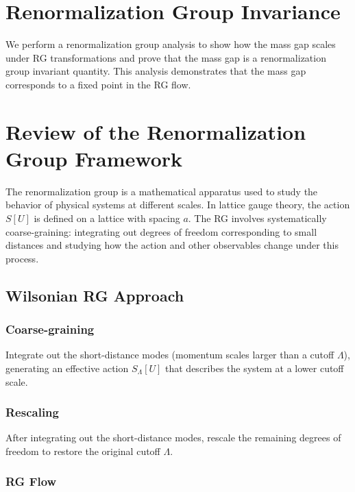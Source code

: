 \section{Renormalization Group Invariance}

We perform a renormalization group analysis to show how the mass gap scales 
under RG transformations and prove that the mass gap is a renormalization 
group invariant quantity. This analysis demonstrates that the mass gap corresponds 
to a fixed point in the RG flow.



\section{Review of the Renormalization Group Framework}

The renormalization group is a mathematical apparatus used to study the behavior of physical systems at different scales. In lattice gauge theory, the action \(S[U]\) is defined on a lattice with spacing \(a\). The RG involves systematically coarse-graining: integrating out degrees of freedom corresponding to small distances and studying how the action and other observables change under this process.

\subsection{Wilsonian RG Approach}

\subsubsection{Coarse-graining} 

Integrate out the short-distance modes (momentum scales larger than a cutoff \(\Lambda\)), generating an effective action \(S_\Lambda[U]\) that describes the system at a lower cutoff scale.

\subsubsection{Rescaling} 

After integrating out the short-distance modes, rescale the remaining degrees of freedom to restore the original cutoff \(\Lambda\).

\subsubsection{RG Flow}

